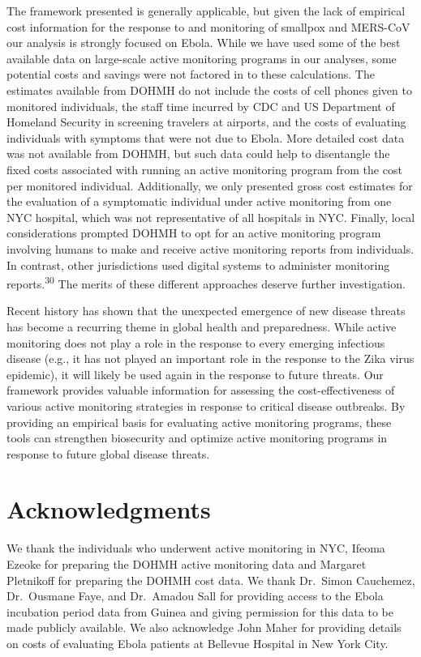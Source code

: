 \documentclass[]{article}
\begin{document}
The framework presented is generally applicable, but given the lack of
empirical cost information for the response to and monitoring of
smallpox and MERS-CoV our analysis is strongly focused on Ebola. While
we have used some of the best available data on large-scale active
monitoring programs in our analyses, some potential costs and savings
were not factored in to these calculations. The estimates available from
DOHMH do not include the costs of cell phones given to monitored
individuals, the staff time incurred by CDC and US Department of
Homeland Security in screening travelers at airports, and the costs of
evaluating individuals with symptoms that were not due to Ebola. More
detailed cost data was not available from DOHMH, but such data could
help to disentangle the fixed costs associated with running an active
monitoring program from the cost per monitored individual. Additionally,
we only presented gross cost estimates for the evaluation of a
symptomatic individual under active monitoring from one NYC hospital,
which was not representative of all hospitals in NYC. Finally, local
considerations prompted DOHMH to opt for an active monitoring program
involving humans to make and receive active monitoring reports from
individuals. In contrast, other jurisdictions used digital systems to
administer monitoring reports.\textsuperscript{30} The merits of these
different approaches deserve further investigation.

Recent history has shown that the unexpected emergence of new disease
threats has become a recurring theme in global health and preparedness.
While active monitoring does not play a role in the response to every
emerging infectious disease (e.g., it has not played an important role
in the response to the Zika virus epidemic), it will likely be used
again in the response to future threats. Our framework provides valuable
information for assessing the cost-effectiveness of various active
monitoring strategies in response to critical disease outbreaks. By
providing an empirical basis for evaluating active monitoring programs,
these tools can strengthen biosecurity and optimize active monitoring
programs in response to future global disease threats.

\section{Acknowledgments}\label{acknowledgments}

We thank the individuals who underwent active monitoring in NYC, Ifeoma
Ezeoke for preparing the DOHMH active monitoring data and Margaret
Pletnikoff for preparing the DOHMH cost data. We thank Dr.~Simon
Cauchemez, Dr.~Ousmane Faye, and Dr.~Amadou Sall for providing access to
the Ebola incubation period data from Guinea and giving permission for
this data to be made publicly available. We also acknowledge John Maher
for providing details on costs of evaluating Ebola patients at Bellevue
Hospital in New York City.
\end{document}
